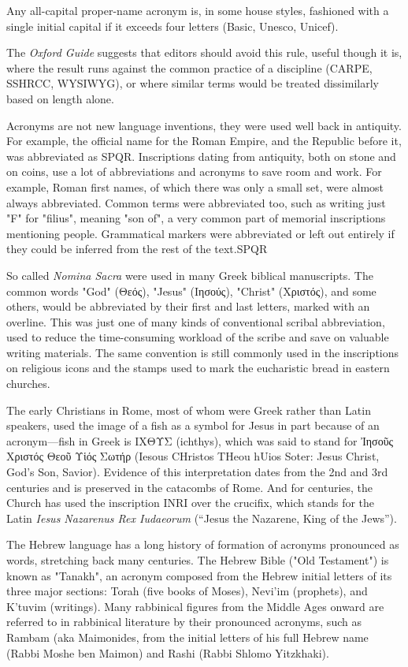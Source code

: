 Any all-capital proper-name acronym is, in some house styles, fashioned
with a single initial capital if it exceeds four letters (Basic, Unesco, Unicef).

The \textit{Oxford Guide} suggests that editors should avoid this rule, useful though it is, where the result runs
against the common practice of a discipline (CARPE, SSHRCC, WYSIWYG), or where similar terms would be treated dissimilarly based on length alone.


Acronyms are not new language inventions, they were used well back in antiquity.  For example, the official name for the Roman Empire, and the Republic before it, was abbreviated as \ac{SPQR}. Inscriptions dating from antiquity, both on stone and on coins, use a lot of abbreviations and acronyms to save room and work. For example, Roman first names, of which there was only a small set, were almost always abbreviated. Common terms were abbreviated too, such as writing just "F" for "filius", meaning "son of", a very common part of memorial inscriptions mentioning people. Grammatical markers were abbreviated or left out entirely if they could be inferred from the rest of the text.\ac{SPQR}

So called \textit{Nomina Sacra} were used in many Greek biblical manuscripts. The common words "God" (Θεός), "Jesus" (Ιησούς), "Christ" (Χριστός), and some others, would be abbreviated by their first and last letters, marked with an overline. This was just one of many kinds of conventional scribal abbreviation, used to reduce the time-consuming workload of the scribe and save on valuable writing materials. The same convention is still commonly used in the inscriptions on religious icons and the stamps used to mark the eucharistic bread in eastern churches.

The early Christians in Rome, most of whom were Greek rather than Latin speakers, used the image of a fish as a symbol for Jesus in part because of an acronym—fish in Greek is ΙΧΘΥΣ (ichthys), which was said to stand for Ἰησοῦς Χριστός Θεοῦ Υἱός Σωτήρ (Iesous CHristos THeou hUios Soter: Jesus Christ, God's Son, Savior). Evidence of this interpretation dates from the 2nd and 3rd centuries and is preserved in the catacombs of Rome. And for centuries, the Church has used the inscription INRI over the crucifix, which stands for the Latin \textit{Iesus Nazarenus Rex Iudaeorum} (``Jesus the Nazarene, King of the Jews'').

The Hebrew language has a long history of formation of acronyms pronounced as words, stretching back many centuries. The Hebrew Bible ("Old Testament") is known as "Tanakh", an acronym composed from the Hebrew initial letters of its three major sections: Torah (five books of Moses), Nevi'im (prophets), and K'tuvim (writings). Many rabbinical figures from the Middle Ages onward are referred to in rabbinical literature by their pronounced acronyms, such as Rambam (aka Maimonides, from the initial letters of his full Hebrew name (Rabbi Moshe ben Maimon) and Rashi (Rabbi Shlomo Yitzkhaki).



